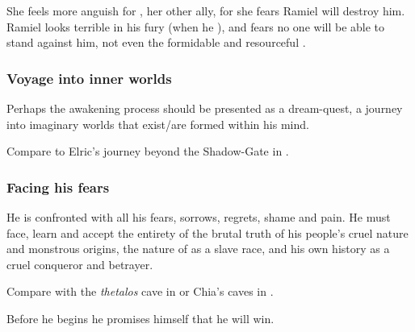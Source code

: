 She feels more anguish for \Dasteron, her other ally, for she fears Ramiel will destroy him.
Ramiel looks terrible in his fury (when he ), and \Cishiel fears no one will be able to stand against him, not even the formidable and resourceful \Dasteron.





\subsubsection{Voyage into inner worlds}
Perhaps the awakening process should be presented as a dream-quest, a journey into imaginary worlds that exist/are formed within his mind. 

Compare to Elric's journey beyond the Shadow-Gate in \cite{MichaelMoorcock:ElricofMelnibone}. 





\subsubsection{Facing his fears}
He is confronted with all his fears, sorrows, regrets, shame and pain. He must face, learn and accept the entirety of the brutal truth of his people's cruel nature and monstrous origins, the nature of \humans{} as a slave race, and his own history as a cruel conqueror and betrayer. 

Compare with the \emph{thetalos} cave in  or Chia's caves in . 

Before he begins he promises himself that he will win. 



